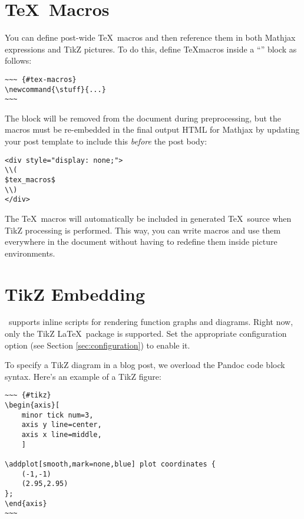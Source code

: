 \documentclass[11pt, letterpaper, oneside, titlepage]{book}
\begin{document}
\section{\TeX\ Macros}

You can define post-wide \TeX\ macros and then reference them in both
Mathjax expressions and TikZ pictures.  To do this, define \TeX macros
inside a ``'' block as follows:

\begin{verbatim}
~~~ {#tex-macros}
\newcommand{\stuff}{...}
~~~
\end{verbatim}

The block will be removed from the document during preprocessing, but the
macros must be re-embedded in the final output HTML for Mathjax by updating
your post template to include this \textit{before} the post body:

\begin{verbatim}
<div style="display: none;">
\\(
$tex_macros$
\\)
</div>
\end{verbatim}

The \TeX\ macros will automatically be included in generated
\TeX\ source when TikZ processing is performed.  This way, you can
write macros and use them everywhere in the document without having to
redefine them inside picture environments.

\section{TikZ Embedding}

\mathblog\ supports inline scripts for rendering function graphs and
diagrams.  Right now, only the TikZ \LaTeX\ package is supported.  Set
the appropriate configuration option (see Section
\ref{sec:configuration}) to enable it.

To specify a TikZ diagram in a blog post, we overload the Pandoc code
block syntax.  Here's an example of a TikZ figure:

\begin{verbatim}
~~~ {#tikz}
\begin{axis}[
    minor tick num=3,
    axis y line=center,
    axis x line=middle,
    ]

\addplot[smooth,mark=none,blue] plot coordinates {
    (-1,-1)
    (2.95,2.95)
};
\end{axis}
~~~
\end{verbatim}
\end{document}
